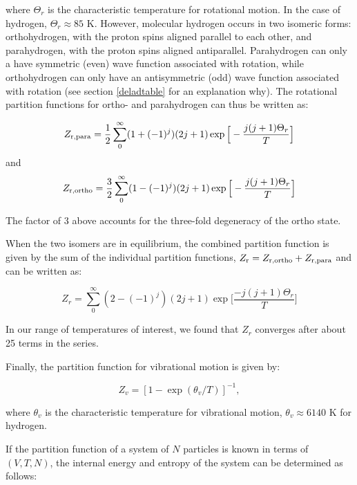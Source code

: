 \documentclass[apj]{emulateapj}
\begin{document}
\noindent where $\Theta_r$ is the characteristic temperature for rotational motion. In the case of hydrogen, $\Theta_r \approx 85$ K. However, molecular hydrogen occurs in two isomeric forms: orthohydrogen, with the proton spins aligned parallel to each other, and parahydrogen, with the proton spins aligned antiparallel. Parahydrogen can only a have symmetric (even) wave function associated with rotation, while orthohydrogen can only have an antisymmetric (odd) wave function associated with rotation (see section \ref{deladtable} for an explanation why). The rotational partition functions for ortho- and parahydrogen can thus be written as:

\begin{equation}
\label{eq:Zpara}
Z_{\rm{r,para}}=\frac{1}{2}\sum_0^\infty (1+(-1)^j) (2 j +1) \exp\Big[-\frac{j(j+1)\Theta_r}{T}\Big]
\end{equation}
and
\begin{equation}
\label{eq:Zortho}
Z_{\rm{r,ortho}}=\frac{3}{2}\sum_0^\infty (1-(-1)^j) (2 j +1) \exp\Big[-\frac{j(j+1)\Theta_r}{T}\Big]
\end{equation}

The factor of 3 above accounts for the three-fold degeneracy of the ortho state.

 When the two isomers are in equilibrium, the combined partition function is given by the sum of the individual partition functions, $Z_{\rm r}=Z_{\rm{r, ortho}}+Z_{\rm{r,para}}$ and can be written as:

\begin{equation}
\label{eq:Zrspin}
Z_r=\sum_0^\infty (2-(-1)^j) (2j+1) \exp{\Big[\frac{-j (j+1) \Theta_r}{T}\Big]}
\end{equation}

In our range of temperatures of interest, we found that $Z_r$ converges after about 25 terms in the series.


Finally, the partition function for vibrational motion is given by:

\begin{equation}
\label{eq:Zv}
Z_v=[1-\exp{(\theta_v/T)}]^{-1},
\end{equation}

\noindent where $\theta_v$ is the characteristic temperature for vibrational motion, $\theta_v \approx 6140$ K for hydrogen. 

If the partition function of a system of $N$ particles is known in terms of $(V, T, N)$, the internal energy and entropy of the system can be determined as follows:
\end{document}
